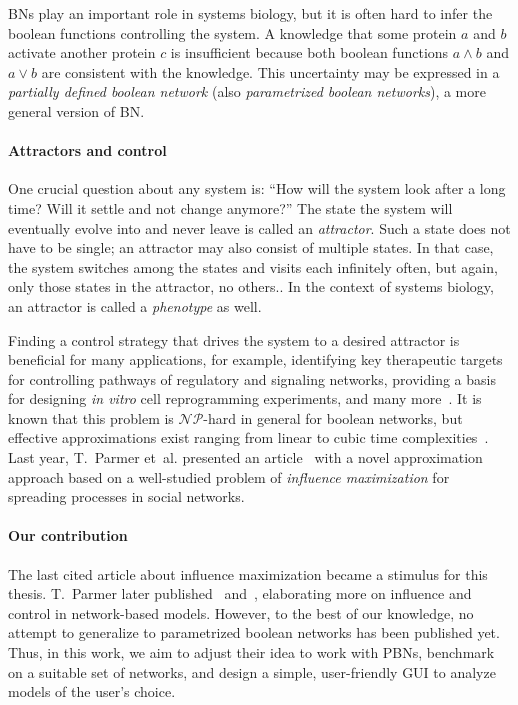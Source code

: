 \documentclass[
	digital, oneside, nosansbold, nocolorbold, nolot, nolof
]{fithesis4}
\theoremstyle{definition}
\theoremstyle{definition}
\begin{document}
BNs play an important role in systems biology, but it is often hard to infer
the boolean functions controlling the system. A knowledge that some protein
\(a\) and \(b\) activate another protein \(c\) is insufficient because both
boolean functions \(a \land b\) and \(a \lor b\) are consistent with the
knowledge. This uncertainty may be expressed in a \emph{partially defined
boolean network} (also \emph{parametrized boolean networks}), a more general version of BN.

\paragraph{Attractors and control}

One crucial question about any system is: \enquote{How will the system look
after a long time? Will it settle and not change anymore?} The state the system
will eventually evolve into and never leave is called an \emph{attractor}. Such
a state does not have to be single; an attractor may also consist of multiple
states. In that case, the system switches among the states and visits each
infinitely often, but again, only those states in the attractor, no others.. In
the context of systems biology, an attractor is called a \emph{phenotype} as
well.

Finding a control strategy that drives the system to a desired attractor is
beneficial for many applications, for example, identifying key therapeutic
targets for controlling pathways of regulatory and signaling networks,
providing a basis for designing \emph{in vitro} cell reprogramming experiments,
and many more~\cite{control_psbn}. It is known that this problem is
\(\mathcal{NP}\)-hard in general for boolean networks, but effective
approximations exist ranging from linear to cubic time
complexities~\cite{control_akutsu}. Last year, T.~Parmer et~al. presented an
article~\cite{infl_max_BN} with a novel approximation approach based on a
well-studied problem of \emph{influence maximization} for spreading processes
in social networks.

\paragraph{Our contribution}

The last cited article about influence maximization became a stimulus for this
thesis. T.~Parmer later published
\cite{parmer_dynamical}~and~\cite{parmer_phd}, elaborating more on influence
and control in network-based models. However, to the best of our knowledge, no
attempt to generalize to parametrized boolean networks has been published yet.
Thus, in this work, we aim to adjust their idea to work with PBNs, benchmark on
a suitable set of networks, and design a simple, user-friendly GUI to analyze
models of the user's choice.
\end{document}

